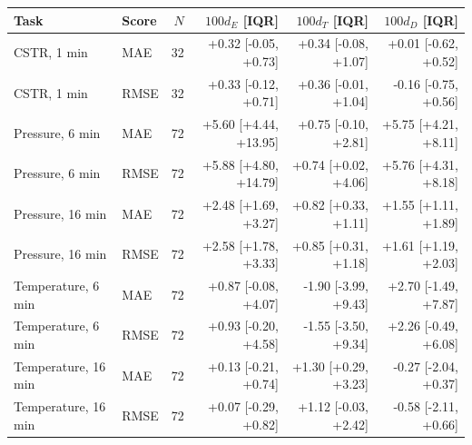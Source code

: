 \begin{tabular}{@{}llrrrr@{}}
\toprule
Task & Score & $N$ & $100d_E$ [IQR] & $100d_T$ [IQR] & $100d_D$ [IQR] \\
\midrule
CSTR, 1 min & MAE & 32 & +0.32 [-0.05, +0.73] & +0.34 [-0.08, +1.07] & +0.01 [-0.62, +0.52] \\
CSTR, 1 min & RMSE & 32 & +0.33 [-0.12, +0.71] & +0.36 [-0.01, +1.04] & -0.16 [-0.75, +0.56] \\
Pressure, 6 min & MAE & 72 & +5.60 [+4.44, +13.95] & +0.75 [-0.10, +2.81] & +5.75 [+4.21, +8.11] \\
Pressure, 6 min & RMSE & 72 & +5.88 [+4.80, +14.79] & +0.74 [+0.02, +4.06] & +5.76 [+4.31, +8.18] \\
Pressure, 16 min & MAE & 72 & +2.48 [+1.69, +3.27] & +0.82 [+0.33, +1.11] & +1.55 [+1.11, +1.89] \\
Pressure, 16 min & RMSE & 72 & +2.58 [+1.78, +3.33] & +0.85 [+0.31, +1.18] & +1.61 [+1.19, +2.03] \\
Temperature, 6 min & MAE & 72 & +0.87 [-0.08, +4.07] & -1.90 [-3.99, +9.43] & +2.70 [-1.49, +7.87] \\
Temperature, 6 min & RMSE & 72 & +0.93 [-0.20, +4.58] & -1.55 [-3.50, +9.34] & +2.26 [-0.49, +6.08] \\
Temperature, 16 min & MAE & 72 & +0.13 [-0.21, +0.74] & +1.30 [+0.29, +3.23] & -0.27 [-2.04, +0.37] \\
Temperature, 16 min & RMSE & 72 & +0.07 [-0.29, +0.82] & +1.12 [-0.03, +2.42] & -0.58 [-2.11, +0.66] \\
\bottomrule
\end{tabular}
